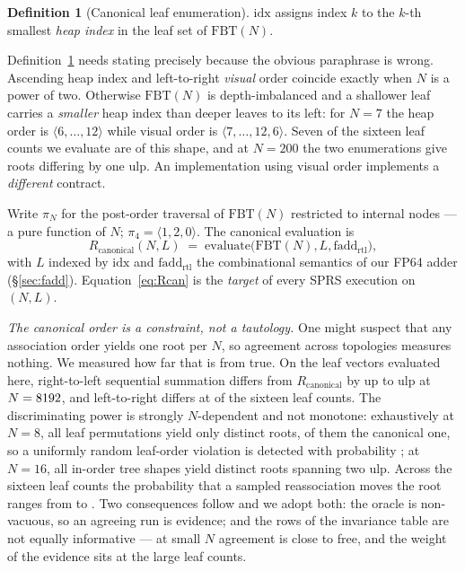 \documentclass[journal,10pt]{IEEEtran}
\theoremstyle{plain}
\theoremstyle{definition}
\newtheorem{definition}{Definition}
\theoremstyle{remark}
\newcommand{\FBT}{\ensuremath{\mathrm{FBT}}}
\newcommand{\fadd}{\ensuremath{\mathrm{fadd}_{\mathrm{rtl}}}}
\newcommand{\Rcan}{\ensuremath{R_{\mathrm{canonical}}}}
\newcommand{\sprs}{\textsc{SPRS}}
\begin{document}
\begin{definition}[Canonical leaf enumeration]\label{def:leafenum}
$\mathrm{idx}$ assigns index $k$ to the $k$-th smallest \emph{heap index} in
the leaf set of $\FBT(N)$.
\end{definition}

Definition~\ref{def:leafenum} needs stating precisely because the obvious
paraphrase is wrong. Ascending heap index and left-to-right \emph{visual}
order coincide exactly when $N$ is a power of two. Otherwise $\FBT(N)$ is
depth-imbalanced and a shallower leaf carries a \emph{smaller} heap index than
deeper leaves to its left: for $N=7$ the heap order is
$\langle 6,\ldots,12\rangle$ while visual order is
$\langle 7,\ldots,12,6\rangle$. Seven of the sixteen leaf counts we evaluate
are of this shape, and at $N=200$ the two enumerations give roots differing by
one ulp. An implementation using visual order implements a \emph{different}
contract.

Write $\pi_N$ for the post-order traversal of $\FBT(N)$ restricted to internal
nodes --- a pure function of $N$; $\pi_4 = \langle 1,2,0\rangle$. The
canonical evaluation is
\begin{equation}\label{eq:Rcan}
  \Rcan(N, L) \;=\; \mathrm{evaluate}\bigl(\FBT(N), L, \fadd\bigr),
\end{equation}
with $L$ indexed by $\mathrm{idx}$ and $\fadd$ the combinational semantics of
our FP64 adder (\S\ref{sec:fadd}). Equation~\eqref{eq:Rcan} is the
\emph{target} of every \sprs{} execution on $(N,L)$.

\emph{The canonical order is a constraint, not a tautology.} One might suspect
that any association order yields one root per $N$, so agreement across
topologies measures nothing. We measured how far that is from true. On the
leaf vectors evaluated here, right-to-left sequential summation differs from
$\Rcan$ by up to \OrderUlpMax{} ulp at $N = 8192$, and left-to-right
differs at \OrderLRDiff{} of the sixteen leaf counts. The discriminating power
is strongly $N$-dependent and not monotone: exhaustively at $N=8$, all
\OrderPermsEight{} leaf permutations yield only \OrderRootsEight{} distinct
roots, \OrderCanonPctEight{} of them the canonical one, so a uniformly random
leaf-order violation is detected with probability \OrderDetectEight{}; at
$N=16$, all \OrderShapesSixteen{} in-order tree shapes yield
\OrderRootsSixteen{} distinct roots spanning two ulp. Across the sixteen leaf
counts the probability that a sampled reassociation moves the root ranges from
\OrderProbMin{} to \OrderProbMax{}. Two consequences follow and we adopt both:
the oracle is non-vacuous, so an agreeing run is evidence; and the rows of the
invariance table are not equally informative --- at small $N$ agreement is
close to free, and the weight of the evidence sits at the large leaf counts.
\end{document}
